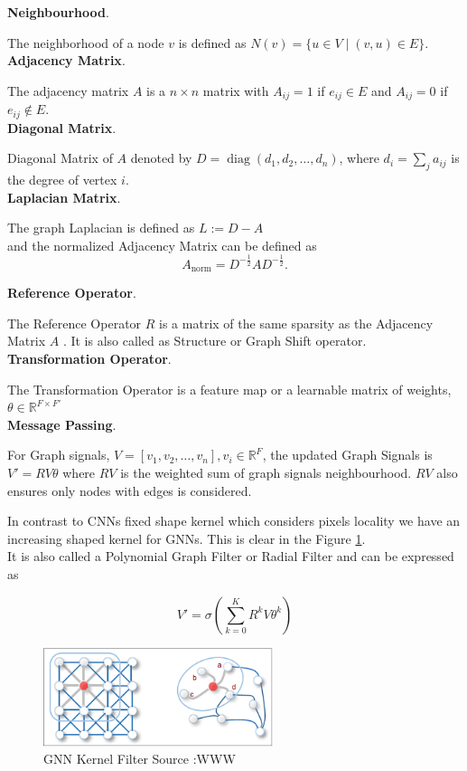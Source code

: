 \documentclass{report} %
\begin{document}
\textbf{Neighbourhood}. 

The neighborhood of a node \( v \) is defined as \( N(v) = \{ u \in V \mid (v, u) \in E \} \).\\

\textbf{Adjacency Matrix}. 

The adjacency matrix \( A \) is a \( n \times n \) matrix with \( A_{ij} = 1 \) if \( e_{ij} \in E \) and \( A_{ij} = 0 \) if \( e_{ij} \notin E \).\\

\textbf{Diagonal Matrix}. 

Diagonal Matrix of \( A \) denoted by  \( D = \operatorname{diag}(d_1, d_2, \dots, d_n) \), where \( d_i = \sum_{j} a_{ij} \) is the degree of vertex \( i \).\\

\textbf{Laplacian Matrix}. 

The graph Laplacian is defined as \( L := D - A \) \\
and the normalized Adjacency Matrix can be defined as
\[
A_{\text{norm}} = D^{-\frac{1}{2}} A D^{-\frac{1}{2}}.
\]

\textbf{Reference Operator}.

The Reference Operator  \( R \) is a matrix of the same sparsity as the Adjacency Matrix \( A \) .
It is also called as Structure or Graph Shift operator.\\

\textbf{Transformation Operator}.

The Transformation Operator is a feature map or a learnable matrix of weights, \( \theta \in \mathbb{R}^{F \times F'} \)\\

\textbf{Message Passing}. 

For Graph signals, \( V = [v_1, v_2, \dots, v_n], v_i  \in \mathbb{R}^F \), the updated Graph Signals is \( V' = RV\theta \) 
where \( RV \) is the weighted sum of graph signals neighbourhood. \( RV \) also ensures only nodes with edges is considered.

In contrast to \ac{CNN}s fixed shape kernel which considers pixels locality we have an increasing shaped kernel for \ac{GNN}s.
This is clear in the Figure \ref{fig:GNN Kernel Filter}.\\
It is also called a Polynomial Graph Filter or Radial Filter and can be expressed as

\[ V' = \sigma (\sum_{k=0}^{K}R^{k}V\theta^{k}) \]

\begin{figure}[H]
    \centering
    \includegraphics[width=0.6\textwidth]{./ReportImages/GNNKernel.png} 
    \caption{\ac{GNN} Kernel Filter Source :WWW}
    \label{fig:GNN Kernel Filter}
\end{figure}
\end{document}
